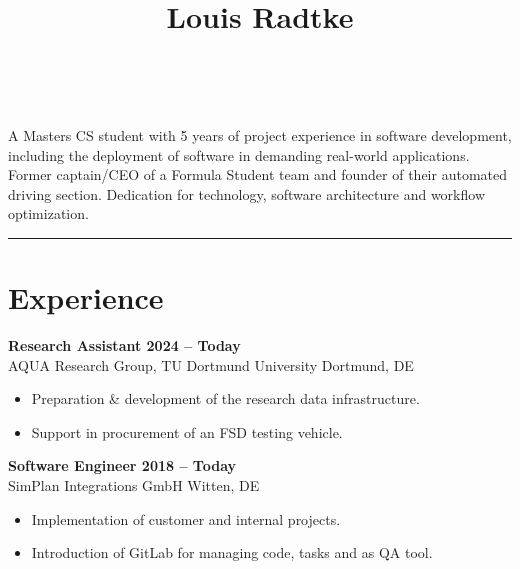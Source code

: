 \documentclass[a4paper,11pt]{article}
\newcommand{\subsectionskip}[0]{\vspace{0.125cm}}
\newcommand{\col}[2]{\textcolor[HTML]{#1}{#2}}
\begin{document}
\hfill
\begin{minipage}[t]{0.65\textwidth}
    \vspace{0cm} %
    \begin{center}
        \title*{\Huge \textbf{Louis Radtke}}\\
    \end{center}

    \vspace{0.125cm}

    {
        \small A Masters CS student with 5 years of project experience in software development, including the deployment of software in demanding real-world applications. Former captain/CEO of a Formula Student team and founder of their automated driving section. Dedication for technology, software architecture and workflow optimization.
    }


    \vspace{0.25cm}
    \hrule

    \section*{\col{b1784a}{Experience}}
    \col{b57e53}{\textbf{Research Assistant \hfill 2024 -- Today}}\\
    AQUA Research Group, TU Dortmund University \hfill Dortmund, DE
    \begin{itemize}
        \small
        \item Preparation \& development of the research data infrastructure.
        \item Support in procurement of an FSD testing vehicle.
    \end{itemize}

    \subsectionskip

    \col{ae7c58}{\textbf{Software Engineer \hfill 2018 -- Today}} \\
    SimPlan Integrations GmbH \hfill Witten, DE
    \begin{itemize}
        \small
        \item Implementation of customer and internal projects.
        \item Introduction of GitLab for managing code, tasks and as QA tool.
    \end{itemize}


\end{minipage}
\end{document}
